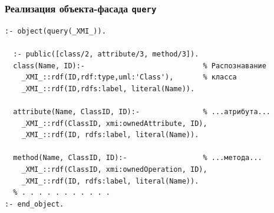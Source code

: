 \documentclass[10pt]{beamer}
\begin{document}
\begin{frame}[fragile]
  \frametitle{Реализация объекта-фасада \texttt{query}}
\begin{verbatim}
:- object(query(_XMI_)).

  :- public([class/2, attribute/3, method/3]).
  class(Name, ID):-                            % Распознавание
    _XMI_::rdf(ID,rdf:type,uml:'Class'),       % класса
    _XMI_::rdf(ID,rdfs:label, literal(Name)).

  attribute(Name, ClassID, ID):-               % ...атрибута...
    _XMI_::rdf(ClassID, xmi:ownedAttribute, ID),
    _XMI_::rdf(ID, rdfs:label, literal(Name)).

  method(Name, ClassID, ID):-                  % ...метода...
    _XMI_::rdf(ClassID, xmi:ownedOperation, ID),
    _XMI_::rdf(ID, rdfs:label, literal(Name)).
  % . . . . . . . . . . .
:- end_object.
\end{verbatim}
\end{frame}
\end{document}
